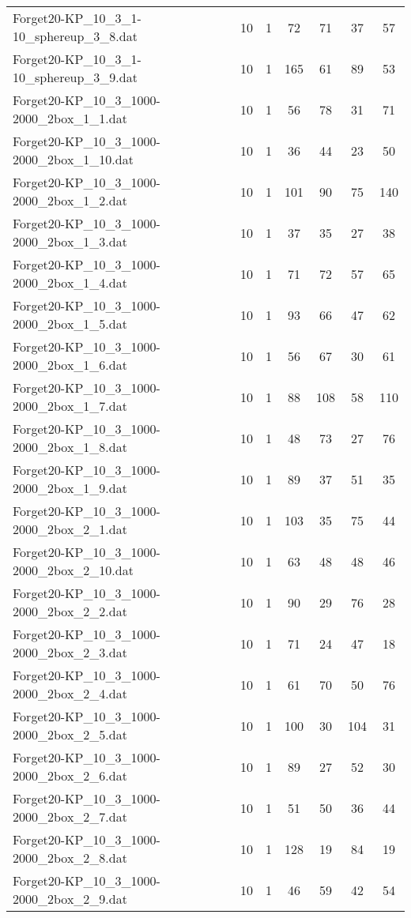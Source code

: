 \begin{table}[!ht]
\begin{tabular}{lcccccc}
Forget20-KP\_10\_3\_1-10\_sphereup\_3\_8.dat & 10 & 1 & 72 & 71 & 37 & 57 \\
Forget20-KP\_10\_3\_1-10\_sphereup\_3\_9.dat & 10 & 1 & 165 & 61 & 89 & 53 \\
Forget20-KP\_10\_3\_1000-2000\_2box\_1\_1.dat & 10 & 1 & 56 & 78 & 31 & 71 \\
Forget20-KP\_10\_3\_1000-2000\_2box\_1\_10.dat & 10 & 1 & 36 & 44 & 23 & 50 \\
Forget20-KP\_10\_3\_1000-2000\_2box\_1\_2.dat & 10 & 1 & 101 & 90 & 75 & 140 \\
Forget20-KP\_10\_3\_1000-2000\_2box\_1\_3.dat & 10 & 1 & 37 & 35 & 27 & 38 \\
Forget20-KP\_10\_3\_1000-2000\_2box\_1\_4.dat & 10 & 1 & 71 & 72 & 57 & 65 \\
Forget20-KP\_10\_3\_1000-2000\_2box\_1\_5.dat & 10 & 1 & 93 & 66 & 47 & 62 \\
Forget20-KP\_10\_3\_1000-2000\_2box\_1\_6.dat & 10 & 1 & 56 & 67 & 30 & 61 \\
Forget20-KP\_10\_3\_1000-2000\_2box\_1\_7.dat & 10 & 1 & 88 & 108 & 58 & 110 \\
Forget20-KP\_10\_3\_1000-2000\_2box\_1\_8.dat & 10 & 1 & 48 & 73 & 27 & 76 \\
Forget20-KP\_10\_3\_1000-2000\_2box\_1\_9.dat & 10 & 1 & 89 & 37 & 51 & 35 \\
Forget20-KP\_10\_3\_1000-2000\_2box\_2\_1.dat & 10 & 1 & 103 & 35 & 75 & 44 \\
Forget20-KP\_10\_3\_1000-2000\_2box\_2\_10.dat & 10 & 1 & 63 & 48 & 48 & 46 \\
Forget20-KP\_10\_3\_1000-2000\_2box\_2\_2.dat & 10 & 1 & 90 & 29 & 76 & 28 \\
Forget20-KP\_10\_3\_1000-2000\_2box\_2\_3.dat & 10 & 1 & 71 & 24 & 47 & 18 \\
Forget20-KP\_10\_3\_1000-2000\_2box\_2\_4.dat & 10 & 1 & 61 & 70 & 50 & 76 \\
Forget20-KP\_10\_3\_1000-2000\_2box\_2\_5.dat & 10 & 1 & 100 & 30 & 104 & 31 \\
Forget20-KP\_10\_3\_1000-2000\_2box\_2\_6.dat & 10 & 1 & 89 & 27 & 52 & 30 \\
Forget20-KP\_10\_3\_1000-2000\_2box\_2\_7.dat & 10 & 1 & 51 & 50 & 36 & 44 \\
Forget20-KP\_10\_3\_1000-2000\_2box\_2\_8.dat & 10 & 1 & 128 & 19 & 84 & 19 \\
Forget20-KP\_10\_3\_1000-2000\_2box\_2\_9.dat & 10 & 1 & 46 & 59 & 42 & 54 \\

\end{tabular}
\end{table}
